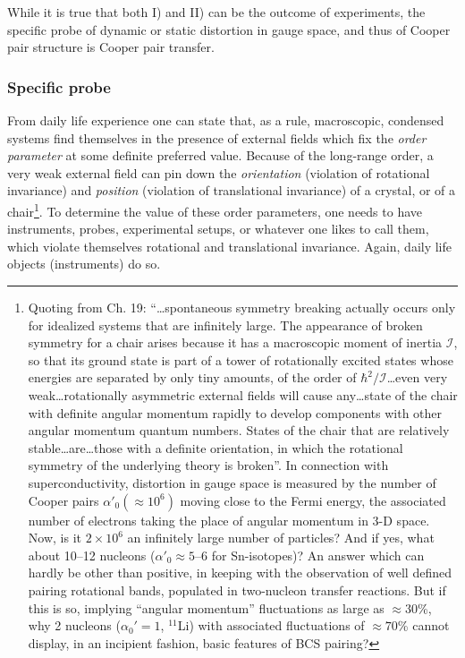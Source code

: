 While it is true that both I) and II) can be the outcome of experiments, the specific probe of dynamic or static distortion in gauge space, and thus of Cooper pair structure is Cooper pair transfer.



\subsubsection{Specific probe}
From daily life experience one can state that, as a rule, macroscopic, condensed systems find themselves in the presence of external fields which fix the \textit{order parameter} at some definite preferred value. Because of the long-range order, a very weak external field can pin down the \textit{orientation} (violation of rotational invariance) and \textit{position} (violation of translational invariance) of a crystal, or of a chair\footnote{Quoting from \cite{Weinberg:96b} Ch. 19: ``\dots spontaneous symmetry breaking actually occurs only for idealized systems that are infinitely large. The appearance of broken symmetry for a chair arises because it has a macroscopic moment of inertia $\mathcal I$, so that its ground state is part of a tower of rotationally excited states whose energies are separated by only tiny amounts, of the order of $\hbar^2/\mathcal I$\dots even very weak\dots rotationally asymmetric external fields will cause any\dots state of the chair with definite angular momentum rapidly to develop components with other angular momentum quantum numbers. States of the chair that are relatively stable\dots are\dots those with a definite orientation, in which the rotational symmetry of the underlying theory is broken''. In connection with superconductivity, distortion in gauge space is measured by the number of Cooper pairs   $\alpha'_0(\approx10^6)$ 
	 moving close to the Fermi energy, the associated number of electrons taking the place of angular momentum in 3-D space. Now, is it $2\times10^6$ an infinitely large number of particles? And if yes, what about 10--12 nucleons ($\alpha'_0\approx5$--6 for Sn-isotopes)? An answer which can hardly be other than positive, in keeping with the observation of well defined pairing rotational bands, populated in two-nucleon transfer reactions. But if this is so, implying ``angular momentum'' fluctuations as large as $\approx30$\%, why 2 nucleons ($\alpha_0'=1$, $^{11}$Li) with associated fluctuations of $\approx70$\% cannot display, in an incipient fashion, basic features of BCS pairing?}.  To determine the value of these order parameters, one needs to have instruments, probes, experimental setups, or whatever one likes to call them, which violate themselves rotational and translational invariance. Again, daily life objects (instruments) do so.


